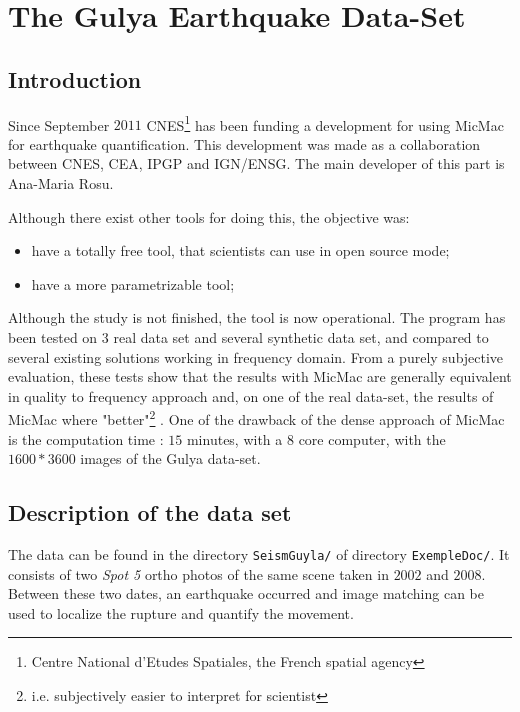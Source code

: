 \section{The Gulya Earthquake Data-Set}

\label{Gulya}

\subsection{Introduction}

Since September $2011$ CNES\footnote{Centre National d'Etudes Spatiales, the French spatial agency}
has been funding a development for using MicMac for  earthquake quantification. This development
was made as a collaboration between CNES, CEA, IPGP and IGN/ENSG. The main developer of this part
is Ana-Maria Rosu.

Although there exist other tools for doing this, the objective was:

\begin{itemize}
   \item have a totally free tool, that scientists can use in open source mode;
   \item have a more parametrizable tool;
\end{itemize}

Although the study is not finished, the tool  is now operational. The program has been
tested on $3$ real data set and several synthetic data set, and compared to several existing solutions
working in frequency domain. From a purely subjective evaluation, these tests show that the
results with MicMac are generally equivalent in quality to frequency approach and, on one of the
real data-set, the results of MicMac where "better"\footnote{i.e. subjectively easier to interpret
for scientist} . One of the drawback of the dense approach of
MicMac is the computation time : $15$ minutes, with a $8$ core computer, with the $1600*3600$
images of the Gulya data-set.



\subsection{Description of the data set}

The data can be found in the directory {\tt {SeismGuyla/}}
 of directory {\tt ExempleDoc/}. %
It consists of  two \emph{Spot 5} ortho photos of the same scene taken in $2002$ and
$2008$. Between these two dates, an earthquake occurred and image matching can be used to
localize the rupture and quantify the movement.

